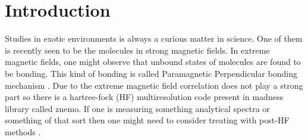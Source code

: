 \section{Introduction}
Studies in exotic environments is always a curious matter in science. One of them is recently seen to be the molecules in strong magnetic fields\cite{langeParamagneticBondingMechanism2012}. In extreme magnetic fields, one might observe that unbound states of molecules are found to be bonding. This kind of bonding is called Paramagnetic Perpendicular bonding mechanism \cite{langeParamagneticBondingMechanism2012}. Due to the extreme magnetic field correlation\cite{langeParamagneticBondingMechanism2012} does not play a strong part so there is a hartree-fock (HF) multiresolution code present in madness library called znemo\cite{bischoffStructureMathrmMolecule2020}. If one is measuring something analytical spectra or something of that sort then one might need to consider treating with post-HF methods \cite{stopkowiczPerspectiveCoupledCluster2018}. 